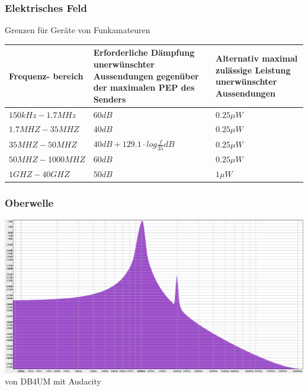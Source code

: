 \begin{frame}
    \frametitle{Elektrisches Feld}
    \begin{center}
	\begin{block}{Grenzen für Geräte von Funkamateuren}
		 \begin{tabular}{p{1.7cm}|p{4cm}|p{3cm}}
  		Frequenz- bereich & Erforderliche Dämpfung unerwünschter Aussendungen gegenüber der maximalen PEP des Senders & Alternativ maximal zulässige Leistung unerwünschter Aussendungen \\ \hline \hline
  		$150kHz - 1.7MHz$ & $60dB$ & $0.25 \mu W$ \\ \hline
  		$1.7MHZ - 35MHZ$ & $40dB$ & $0.25 \mu W$ \\ \hline
  		$35MHZ - 50MHZ$ & $40dB + 129.1 \cdot log \frac{f}{35}dB $ & $0.25 \mu W$ \\ \hline
  		$50MHZ - 1000MHZ$ & $60dB$ & $0.25 \mu W$ \\ \hline
  		$1GHZ - 40GHZ$ & $50dB$ & $1 \mu W$
 \end{tabular}
	\end{block}
    \end{center}
\end{frame}

\begin{frame}
    \frametitle{Oberwelle}
    \begin{center}
		\includegraphics[width=1\textwidth]{a19/oberwelle.png}\\
        \tiny von DB4UM mit Audacity \\[1em]
	\end{center}
\end{frame}

